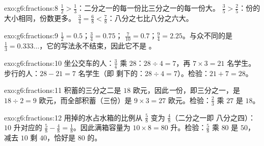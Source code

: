\begin{solution}{exo:g6:fractions:8}
$\frac12 > \frac13$：二分之一的每一份比三分之一的每一份大。
$\frac35 > \frac25$：份的大小相同，份数更多。
$\frac34 = \frac68 < \frac78$：八分之七比八分之六大。
\end{solution}

\begin{solution}{exo:g6:fractions:9}
$\frac12 = 0.5$；\quad $\frac34 = 0.75$；\quad
$\frac{7}{10} = 0.7$；\quad $\frac94 = 2.25$。与众不同的是
$\frac13 = 0.333\dots$，它的写法永不结束，因此它不是
。
\end{solution}

\begin{solution}{exo:g6:fractions:10}
坐公交车的人：$\frac34$ 乘 $28$：$28 \div 4 = 7$，再
$7 \times 3 = 21$ 名学生。步行的人：$28 - 21 = 7$ 名学生（即
剩下的：$28 \div 4 = 7$）。检验：$21 + 7 = 28$。
\end{solution}

\begin{solution}{exo:g6:fractions:11}
积蓄的三分之二是 $18$ 欧元，因此\emph{一}份，即三分之一，是
$18 \div 2 = 9$ 欧元，而全部积蓄（三份）是
$9 \times 3 = 27$ 欧元。检验：$\frac23$ 乘 $27$ 是 $18$。
\end{solution}

\begin{solution}{exo:g6:fractions:12}
用掉的水占水箱的比例从 $\frac58$ 变为 $\frac48$（二分之一即
八分之四）：$10$ 升对应的
$\frac58 - \frac48 = \frac18$。因此满箱容量为
$10 \times 8 = 80$ 升。检验：$\frac58$ 乘 $80$ 是 $50$，减去
$10$ 剩 $40$，恰好是 $80$ 的。
\end{solution}


